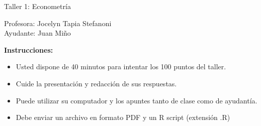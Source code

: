 \documentclass[letterpaper,11pt]{article}
\begin{document}
\begin{center}
    {\Large  Taller 1: Econometría }

Profesora:    Jocelyn Tapia Stefanoni\\
Ayudante: Juan Miño
\end{center}

\textbf{Instrucciones:} 

\begin{itemize}
    \item Usted dispone de 40 minutos  para intentar los 100 puntos del taller.
    \item Cuide la presentación y redacción de sus respuestas.
    \item Puede utilizar su computador y los apuntes tanto de clase como de ayudantía.
    \item Debe enviar un archivo en formato PDF y un R script (extensión .R)
\end{itemize}
\end{document}
